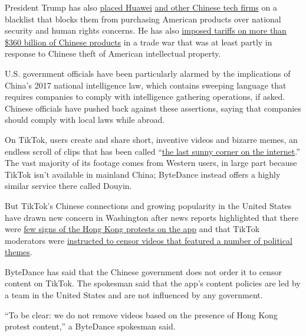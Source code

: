 President Trump has also
\href{https://www.nytimes3xbfgragh.onion/2019/05/16/technology/huawei-ban-president-trump.html}{placed
Huawei}
\href{https://www.nytimes3xbfgragh.onion/2019/10/07/us/politics/us-to-blacklist-28-chinese-entities-over-abuses-in-xinjiang.html}{and
other Chinese tech firms} on a blacklist that blocks them from
purchasing American products over national security and human rights
concerns. He has also
\href{https://www.nytimes3xbfgragh.onion/2019/10/08/us/politics/trump-trade-war-imf.html}{imposed
tariffs on more than \$360 billion of Chinese products} in a trade war
that was at least partly in response to Chinese theft of American
intellectual property.

U.S. government officials have been particularly alarmed by the
implications of China's 2017 national intelligence law, which contains
sweeping language that requires companies to comply with intelligence
gathering operations, if asked. Chinese officials have pushed back
against these assertions, saying that companies should comply with local
laws while abroad.

On TikTok, users create and share short, inventive videos and bizarre
memes, an endless scroll of clips that has been called
``\href{https://www.newyorker.com/magazine/2019/09/30/how-tiktok-holds-our-attention}{the
last sunny corner on the internet}.'' The vast majority of its footage
comes from Western users, in large part because TikTok isn't available
in mainland China; ByteDance instead offers a highly similar service
there called Douyin.

But TikTok's Chinese connections and growing popularity in the United
States have drawn new concern in Washington after news reports
highlighted that there were
\href{https://www.washingtonpost.com/technology/2019/09/15/tiktoks-beijing-roots-fuel-censorship-suspicion-it-builds-huge-us-audience/}{few
signs of the Hong Kong protests on the app} and that TikTok moderators
were
\href{https://www.theguardian.com/technology/2019/sep/25/revealed-how-tiktok-censors-videos-that-do-not-please-beijing}{instructed
to censor videos that featured a number of political themes}.

ByteDance has said that the Chinese government does not order it to
censor content on TikTok. The spokesman said that the app's content
policies are led by a team in the United States and are not influenced
by any government.

``To be clear: we do not remove videos based on the presence of Hong
Kong protest content,'' a ByteDance spokesman said.


